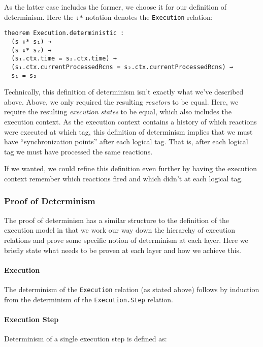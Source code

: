 As the latter case includes the former, we choose it for our definition of determinism.
Here the \lstinline{⇓*} notation denotes the \lstinline{Execution} relation:

\begin{lstlisting}
theorem Execution.deterministic : 
  (s ⇓* s₁) → 
  (s ⇓* s₂) → 
  (s₁.ctx.time = s₂.ctx.time) → 
  (s₁.ctx.currentProcessedRcns = s₂.ctx.currentProcessedRcns) → 
  s₁ = s₂
\end{lstlisting}

Technically, this definition of determinism isn't exactly what we've described above.
Above, we only required the resulting \emph{reactors} to be equal.
Here, we require the resulting \emph{execution states} to be equal, which also includes the execution context.
As the execution context contains a history of which reactions were executed at which tag, this definition of determinism implies that we must have ``synchronization points'' after each logical tag.
That is, after each logical tag we must have processed the same reactions.

If we wanted, we could refine this definition even further by having the execution context remember which reactions fired and which didn't at each logical tag.

\subsubsection{Proof of Determinism}

The proof of determinism has a similar structure to the definition of the execution model in that we work our way down the hierarchy of execution relations and prove some specific notion of determinism at each layer.
Here we briefly state what needs to be proven at each layer and how we achieve this.

\paragraph{Execution}

The determinism of the \lstinline{Execution} relation (as stated above) follows by induction from the determinism of the \lstinline{Execution.Step} relation.

\paragraph{Execution Step}

Determinism of a single execution step is defined as:

